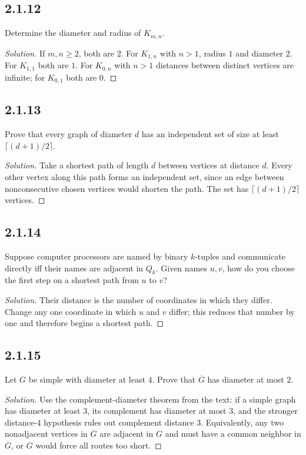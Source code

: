 \documentclass[12pt]{amsart}
\newenvironment{solution}{\begin{proof}[Solution]}{\end{proof}}
\begin{document}
    \subsection*{2.1.12} Determine the diameter and radius of $K_{m,n}$.
    \begin{solution}If $m,n\ge2$, both are $2$. For $K_{1,n}$ with $n>1$, radius $1$ and diameter $2$. For $K_{1,1}$ both are $1$. For $K_{0,n}$ with $n>1$ distances between distinct vertices are infinite; for $K_{0,1}$ both are $0$.\end{solution}
    \subsection*{2.1.13} Prove that every graph of diameter $d$ has an independent set of size at least $\lceil(d+1)/2\rceil$.
    \begin{solution}Take a shortest path of length $d$ between vertices at distance $d$. Every other vertex along this path forms an independent set, since an edge between nonconsecutive chosen vertices would shorten the path. The set has $\lceil(d+1)/2\rceil$ vertices.\end{solution}
    \subsection*{2.1.14} Suppose computer processors are named by binary $k$-tuples and communicate directly iff their names are adjacent in $Q_k$. Given names $u,v$, how do you choose the first step on a shortest path from $u$ to $v$?
    \begin{solution}Their distance is the number of coordinates in which they differ. Change any one coordinate in which $u$ and $v$ differ; this reduces that number by one and therefore begins a shortest path.\end{solution}
    \subsection*{2.1.15} Let $G$ be simple with diameter at least $4$. Prove that $\overline G$ has diameter at most $2$.
    \begin{solution}Use the complement-diameter theorem from the text: if a simple graph has diameter at least $3$, its complement has diameter at most $3$, and the stronger distance-$4$ hypothesis rules out complement distance $3$. Equivalently, any two nonadjacent vertices in $\overline G$ are adjacent in $G$ and must have a common neighbor in $\overline G$, or $G$ would force all routes too short.\end{solution}
\end{document}
